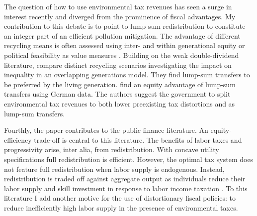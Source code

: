 The question of how to use environmental tax revenues has seen a surge in interest recently and diverged from the prominence of fiscal advantages. 
My contribution to this debate is to point to lump-sum redistribution to constitute an integer part of an efficient pollution mitigation. %
The advantage of different recycling means is often assessed using inter- and within generational equity or political feasibility as value measures \citep{Carattini2018, Goulder2019IncomeGroups, VANDERPLOEG2022103966, Kotlikoff2021MakingWin, Carbone2013DeficitImpacts}. Building on the weak double-dividend literature, \cite{Fried2018TheGenerations} compare distinct recycling scenarios investigating the impact on inequality in an overlapping generations model. They find lump-sum transfers to be preferred by the  living generation.  \cite{VANDERPLOEG2022103966} find an equity advantage of lump-sum transfers using German data. The authors suggest the government to split environmental tax revenues to both lower preexisting tax distortions and as lump-sum transfers. %


Fourthly, the paper contributes to the public finance literature.
An equity-efficiency trade-off is central to this literature.  The benefits of labor taxes and progressivity arise, inter alia, from redistribution. %
With concave utility specifications full redistribution is efficient. However, the optimal tax system does not feature full redistribution when labor supply is endogenous. Instead, redistribution is traded off against aggregate output as individuals reduce their labor supply and skill investment in response to labor income taxation \citep{Heathcote2017OptimalFramework, Conesa2009TaxingAll, Domeij2004OnTaxes}.
To this literature I add another motive for the use of distortionary fiscal policies: to reduce inefficiently high labor supply in the presence of environmental taxes. 



